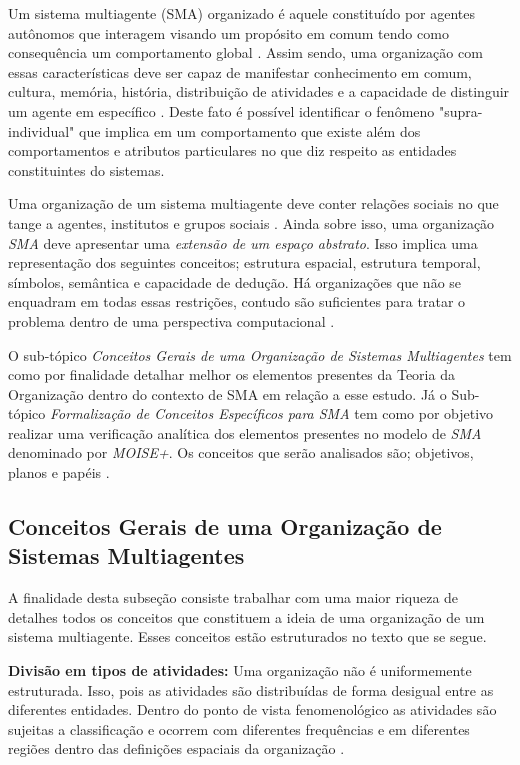 Um sistema multiagente (SMA) organizado é aquele constituído por agentes autônomos que interagem visando um propósito em comum tendo como consequência um comportamento global \cite{moiseframework} \cite{organiationofmultiagentsystem}. Assim sendo, uma organização com essas características deve ser capaz de manifestar conhecimento em comum, cultura, memória, história, distribuição de atividades e a capacidade de distinguir um  agente em específico \cite{organiationofmultiagentsystem}. Deste fato é possível identificar o fenômeno "supra-individual" que implica em um comportamento que existe além dos comportamentos e atributos particulares no que diz respeito as entidades constituintes do sistemas. 

Uma organização de um sistema multiagente deve conter relações sociais no que tange a agentes, institutos e grupos sociais \cite{organiationofmultiagentsystem}. Ainda sobre isso, uma organização \textit{SMA} deve apresentar uma \textit{extensão de um espaço abstrato}. Isso implica uma representação dos seguintes conceitos; estrutura espacial, estrutura temporal, símbolos, semântica e 
capacidade de dedução. Há organizações que não se enquadram em todas essas restrições, contudo são suficientes para tratar o problema dentro de uma perspectiva computacional \cite{organiationofmultiagentsystem}.

O sub-tópico \textit{Conceitos Gerais de uma Organização de Sistemas Multiagentes} tem como por finalidade detalhar melhor os elementos presentes da Teoria da Organização dentro do contexto de SMA em relação a esse estudo. Já o Sub-tópico \textit{Formalização de Conceitos Específicos para SMA} tem como por objetivo realizar uma verificação analítica dos elementos presentes no modelo de \textit{SMA} denominado por \textit{MOISE+}. Os conceitos que serão analisados são; objetivos, planos e papéis \cite{organiationofmultiagentsystem}.
   

\subsection{Conceitos Gerais de uma Organização de Sistemas Multiagentes}

A finalidade desta subseção consiste trabalhar com uma maior riqueza de detalhes todos os conceitos que constituem a ideia de uma organização de um sistema multiagente. Esses conceitos estão estruturados no texto que se segue.
  
\textbf{Divisão em tipos de atividades:} Uma organização não é uniformemente estruturada. Isso, pois as atividades são distribuídas de forma desigual entre as diferentes entidades. Dentro do ponto de vista fenomenológico as atividades são sujeitas a classificação e ocorrem com diferentes frequências e em diferentes regiões dentro das definições espaciais da organização \cite{organiationofmultiagentsystem}.

